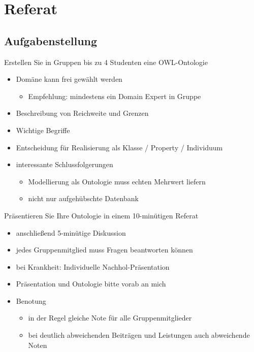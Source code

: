 \documentclass[a4paper]{article}
\begin{document}

\newpage
\section{Referat}

\subsection{Aufgabenstellung}

Erstellen Sie in Gruppen bis zu 4 Studenten eine OWL-Ontologie

\begin{itemize}
    \item Domäne kann frei gewählt werden
    \begin{itemize}
        \item Empfehlung: mindestens ein Domain Expert in Gruppe
    \end{itemize}
    \item Beschreibung von Reichweite und Grenzen
    \item Wichtige Begriffe
    \item Entscheidung für Realisierung als Klasse / Property / Individuum
    \item interessante Schlussfolgerungen
    \begin{itemize}
        \item Modellierung als Ontologie muss echten Mehrwert liefern
        \item nicht nur aufgehübschte Datenbank
    \end{itemize}
\end{itemize}

Präsentieren Sie Ihre Ontologie in einem 10-minütigen Referat

\begin{itemize}
    \item anschließend 5-minütige Diskussion
    \item jedes Gruppenmitglied muss Fragen beantworten können
    \item bei Krankheit: Individuelle Nachhol-Präsentation
    \item Präsentation und Ontologie bitte vorab an mich
    \item Benotung
    \begin{itemize}
        \item in der Regel gleiche Note für alle Gruppenmitglieder
        \item bei deutlich abweichenden Beiträgen und Leistungen auch abweichende Noten
    \end{itemize}
\end{itemize}
\end{document}
